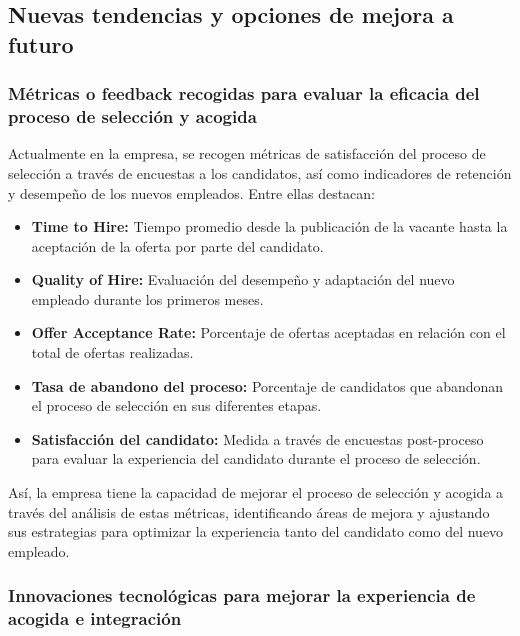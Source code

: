 \subsection{Nuevas tendencias y opciones de mejora a futuro}

\subsubsection{Métricas o feedback recogidas para evaluar la eficacia del proceso de selección y acogida}

Actualmente en la empresa, se recogen métricas de satisfacción del proceso de selección a través de encuestas a los candidatos, así como indicadores de retención y desempeño de los nuevos empleados. Entre ellas destacan:
\begin{itemize}
    \item \textbf{Time to Hire:} Tiempo promedio desde la publicación de la vacante hasta la aceptación de la oferta por parte del candidato.
    \item \textbf{Quality of Hire:} Evaluación del desempeño y adaptación del nuevo empleado durante los primeros meses.
    \item \textbf{Offer Acceptance Rate:} Porcentaje de ofertas aceptadas en relación con el total de ofertas realizadas.
    \item \textbf{Tasa de abandono del proceso:} Porcentaje de candidatos que abandonan el proceso de selección en sus diferentes etapas.
    \item \textbf{Satisfacción del candidato:} Medida a través de encuestas post-proceso para evaluar la experiencia del candidato durante el proceso de selección.
\end{itemize}

Así, la empresa tiene la capacidad de mejorar el proceso de selección y acogida a través del análisis de estas métricas, identificando áreas de mejora y ajustando sus estrategias para optimizar la experiencia tanto del candidato como del nuevo empleado.

\subsubsection{Innovaciones tecnológicas para mejorar la experiencia de acogida e integración}

